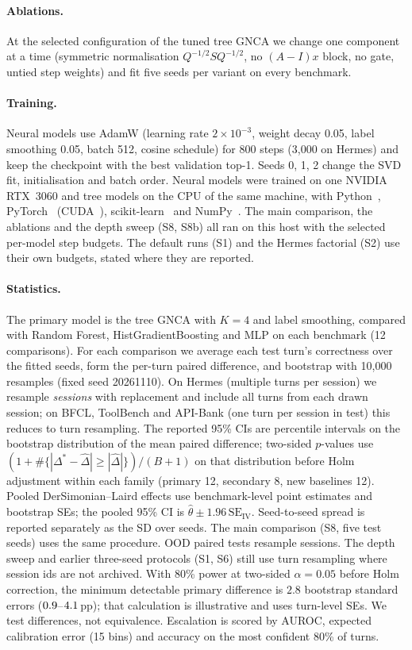 \documentclass[10pt,twocolumn,letterpaper]{article}
\begin{document}
\paragraph{Ablations.} At the selected configuration of the tuned tree GNCA we change one component at a time (symmetric normalisation $Q^{-1/2}SQ^{-1/2}$, no $(A{-}I)x$ block, no gate, untied step weights) and fit five seeds per variant on every benchmark.
\paragraph{Training.} Neural models use AdamW (learning rate $2\times10^{-3}$, weight decay 0.05, label smoothing 0.05, batch 512, cosine schedule) for 800 steps (3{,}000 on Hermes) and keep the checkpoint with the best validation top-1. Seeds 0, 1, 2 change the SVD fit, initialisation and batch order. Neural models were trained on one NVIDIA RTX~3060 and tree models on the CPU of the same machine, with Python~\numEnvPython, PyTorch~\numEnvTorch{} (CUDA~\numEnvCuda), scikit-learn~\numEnvSklearn{} and NumPy~\numEnvNumpy. The main comparison, the ablations and the depth sweep (S8, S8b) all ran on this host with the selected per-model step budgets. The default runs (S1) and the Hermes factorial (S2) use their own budgets, stated where they are reported.
\paragraph{Statistics.} The primary model is the tree GNCA with $K{=}4$ and label smoothing, compared with Random Forest, HistGradientBoosting and MLP on each benchmark (12 comparisons). For each comparison we average each test turn's correctness over the fitted seeds, form the per-turn paired difference, and bootstrap with 10{,}000 resamples (fixed seed 20261110). On Hermes (multiple turns per session) we resample \emph{sessions} with replacement and include all turns from each drawn session; on BFCL, ToolBench and API-Bank (one turn per session in test) this reduces to turn resampling. The reported 95\% CIs are percentile intervals on the bootstrap distribution of the mean paired difference; two-sided $p$-values use $(1+\#\{|\Delta^\ast-\hat\Delta|\ge|\hat\Delta|\})/(B{+}1)$ on that distribution before Holm adjustment within each family (primary 12, secondary 8, new baselines 12). Pooled DerSimonian--Laird effects use benchmark-level point estimates and bootstrap SEs; the pooled 95\% CI is $\hat\theta\pm1.96\,\mathrm{SE}_\mathrm{IV}$. Seed-to-seed spread is reported separately as the SD over seeds. The main comparison (S8, five test seeds) uses the same procedure. OOD paired tests resample sessions. The depth sweep and earlier three-seed protocols (S1, S6) still use turn resampling where session ids are not archived. With 80\% power at two-sided $\alpha{=}0.05$ before Holm correction, the minimum detectable primary difference is $2.8$ bootstrap standard errors ($0.9$--$4.1$\,pp); that calculation is illustrative and uses turn-level SEs. We test differences, not equivalence. Escalation is scored by AUROC, expected calibration error (15 bins) and accuracy on the most confident 80\% of turns.
\end{document}
